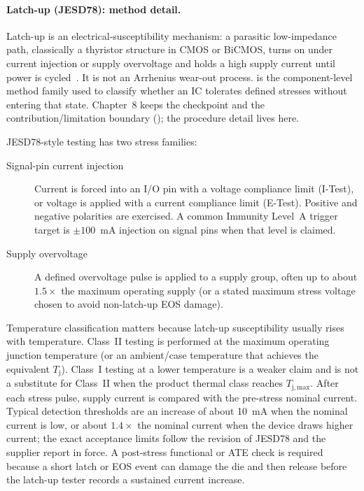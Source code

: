 \paragraph{Latch-up (JESD78): method detail.}
\label{sec:latch-up}
Latch-up is an electrical-susceptibility mechanism: a parasitic low-impedance
path, classically a thyristor structure in CMOS or BiCMOS, turns on under
current injection or supply overvoltage and holds a high supply current until
power is cycled~. It is not an Arrhenius wear-out process.
 is the component-level method family used to
classify whether an IC tolerates defined stresses without entering that state.
Chapter~8 keeps the checkpoint and the contribution/limitation boundary
(); the procedure detail lives here.

JESD78-style testing has two stress families:
\begin{description}
\item[Signal-pin current injection] Current is forced into an I/O pin with a
      voltage compliance limit (I-Test), or voltage is applied with a current
      compliance limit (E-Test). Positive and negative polarities are exercised.
      A common Immunity Level~A trigger target is $\pm100$~mA injection on
      signal pins when that level is claimed.
\item[Supply overvoltage] A defined overvoltage pulse is applied to a supply
      group, often up to about $1.5\times$ the maximum operating supply (or a
      stated maximum stress voltage chosen to avoid non-latch-up EOS damage).
\end{description}

Temperature classification matters because latch-up susceptibility usually
rises with temperature. Class~II testing is performed at the maximum operating
junction temperature (or an ambient/case temperature that achieves the
equivalent $T_\mathrm{j}$). Class~I testing at a lower temperature is a weaker
claim and is not a substitute for Class~II when the product thermal class
reaches $T_\mathrm{j,max}$. After each stress pulse, supply current is compared
with the pre-stress nominal current. Typical detection thresholds are an
increase of about 10~mA when the nominal current is low, or about
$1.4\times$ the nominal current when the device draws higher current; the
exact acceptance limits follow the revision of JESD78 and the supplier report
in force. A post-stress functional or ATE check is required because a short
latch or EOS event can damage the die and then release before the latch-up
tester records a sustained current increase.

